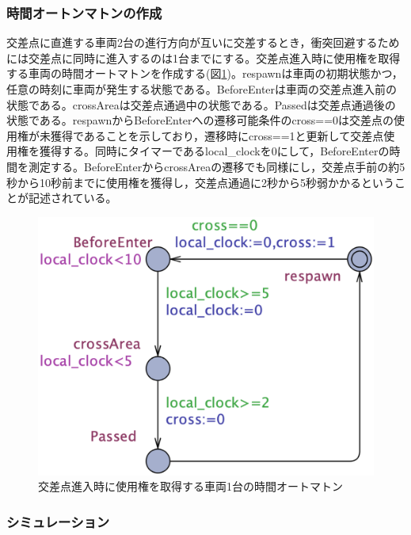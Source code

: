 \documentclass{tpu-sotu}
\begin{document}
	\subsubsection{時間オートンマトンの作成}
	交差点に直進する車両2台の進行方向が互いに交差するとき，衝突回避するためには交差点に同時に進入するのは1台までにする。交差点進入時に使用権を取得する車両の時間オートマトンを作成する(図\ref{Perpendicular})。respawnは車両の初期状態かつ，任意の時刻に車両が発生する状態である。BeforeEnterは車両の交差点進入前の状態である。crossAreaは交差点通過中の状態である。Passedは交差点通過後の状態である。respawnからBeforeEnterへの遷移可能条件のcross==0は交差点の使用権が未獲得であることを示しており，遷移時にcross==1と更新して交差点使用権を獲得する。同時にタイマーであるlocal\_clockを0にして，BeforeEnterの時間を測定する。BeforeEnterからcrossAreaの遷移でも同様にし，交差点手前の約5秒から10秒前までに使用権を獲得し，交差点通過に2秒から5秒弱かかるということが記述されている。
	
	\begin{figure}[htbp]
	\centering
	\includegraphics[width=125mm]{Perpendicular.png}
	\caption{交差点進入時に使用権を取得する車両1台の時間オートマトン}
	\label{Perpendicular}
	\end{figure}
	
	\subsubsection{シミュレーション}
	
\end{document}
